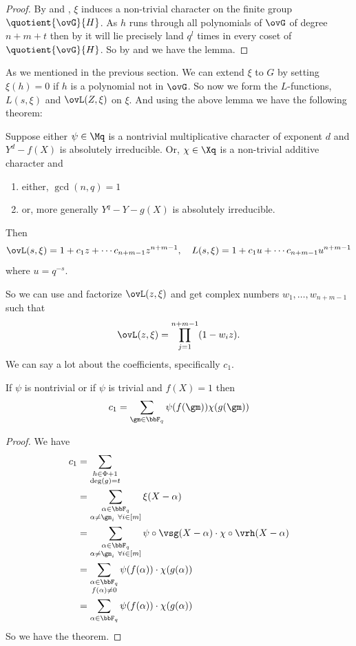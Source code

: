 \begin{proof}
  By  and , $\xi$ induces a non-trivial character on the finite group $\quotient{\ovG}{H}$. As $h$ runs through all polynomials of $\ovG$ of degree $n+m+t$ then by  it will lie precisely land $q^l$ times in every coset of $\quotient{\ovG}{H}$. So by \AddCharPropsthm[(i)] and \MultCharPropsthm[(i)] we have the lemma. 
\end{proof}

As we mentioned in the previous section. We can extend $\xi$ to $G$ by setting $\xi(h)=0$ if $h$ is a polynomial not in $\ovG$. So now we form the $L$-functions, $L(s,\xi)$ and $\ovL(Z,\xi)$ on $\xi$. And using the above lemma we have the following theorem:
\begin{Theorem}{}{}
  Suppose either $\psi\in\Mq$ is a nontrivial multiplicative character of exponent $d$ and $Y^d-f(X)$ is absolutely irreducible. Or, $\chi\in\Xq$ is a non-trivial additive character and 
  \begin{enumerate}[label=(\roman*)]
    \item either, $\gcd(n,q)=1$ 
    \item or, more generally $Y^q-Y-g(X)$ is absolutely irreducible.
  \end{enumerate}
  Then $$\ovL(s,\xi)=1+c_1z+\cdots c_{n+m-1}z^{n+m-1},\quad L(s,\xi)=1+c_1u+\cdots c_{n+m-1}u^{n+m-1}$$where $u=q^{-s}$.
\end{Theorem}

So we can use \LFactthm and factorize $\ovL(z,\xi)$ and get complex numbers $w_1,\dots, w_{n+m-1}$ such that $$\ovL(z,\xi)=\prod_{j=1}^{n+m-1}(1-w_iz).$$ We can say a lot about the coefficients, specifically $c_1$. 
\begin{Theorem}{}{}
  If $\psi$ is nontrivial or if $\psi$ is trivial and $f(X)=1$ then $$c_1=\sum_{\gm\in\bbF_q}\psi(f(\gm))\chi(g(\gm))$$
\end{Theorem}
\begin{proof}
  We have \begin{align*}
    c_1& = \sum_{\substack{h\in\Phi+1\\ \deg(g)=t}}\\ 
    & = \sum_{\substack{\alpha\in\bbF_q\\ \alpha\neq \gm_i\ \forall i\in[m]}}\xi(X-\alpha)\\ 
    & = \sum_{\substack{\alpha\in\bbF_q\\ \alpha\neq \gm_i\ \forall i\in[m]}}\psi\circ\vsg(X-\alpha)\cdot \chi\circ\vrh(X-\alpha)\\ 
    & = \sum_{\substack{\alpha\in\bbF_q\\ f(\alpha)\neq 0}}\psi(f(\alpha))\cdot \chi(g(\alpha))\\ 
    & = \sum_{\alpha\in\bbF_q}\psi(f(\alpha))\cdot \chi(g(\alpha))
  \end{align*}
  So we have the theorem. 
\end{proof}